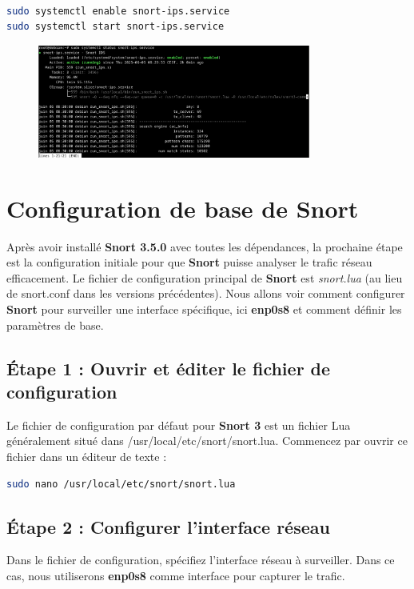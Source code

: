 \documentclass[12pt]{article}
\begin{document}
\begin{lstlisting}[language=bash]

sudo systemctl enable snort-ips.service
sudo systemctl start snort-ips.service
\end{lstlisting}
\begin{figure}[H] 
    \centering
    \includegraphics[width=0.8\textwidth]{captures/image7.png}
    \label{fig:mon_image}
\end{figure}

\section{Configuration de base de Snort}
Après avoir installé \textbf{Snort 3.5.0} avec toutes les dépendances, la prochaine étape est la configuration initiale pour que \textbf{Snort} puisse analyser le trafic réseau efficacement. Le fichier de configuration principal de \textbf{Snort} est \textit{snort.lua} (au lieu de snort.conf dans les versions précédentes). Nous allons voir comment configurer \textbf{Snort} pour surveiller une interface spécifique, ici \textbf{enp0s8} et comment définir les paramètres de base.

\subsection{Étape 1 : Ouvrir et éditer le fichier de configuration}
Le fichier de configuration par défaut pour \textbf{Snort 3 }est un fichier Lua généralement situé dans /usr/local/etc/snort/snort.lua. Commencez par ouvrir ce fichier dans un éditeur de texte :

\begin{lstlisting}[language=bash]
sudo nano /usr/local/etc/snort/snort.lua
\end{lstlisting}
\subsection{Étape 2 : Configurer l’interface réseau}
Dans le fichier de configuration, spécifiez l’interface réseau à surveiller. Dans ce cas, nous utiliserons \textbf{enp0s8} comme interface pour capturer le trafic.
\end{document}
